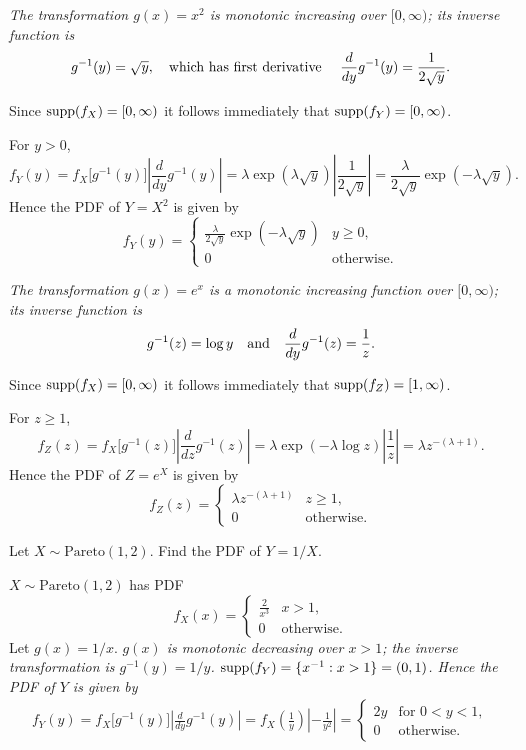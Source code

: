\begin{exercise}
\begin{questions}
\begin{answer}
\ben
\it %
The transformation $g(x)=x^2$ is monotonic increasing over $[0,\infty)$; its inverse function is
\[
g^{-1}(y) =  \sqrt{y},\text{\quad which has first derivative \quad} \frac{d}{dy}g^{-1}(y) = \frac{1}{2\sqrt{y}}.
\]

Since $\text{supp}(f_X)=[0,\infty)$ it follows immediately that $\text{supp}(f_Y)=[0,\infty)$.
\par
For $y>0$, 
\[
f_Y(y) 
	= f_X\big[g^{-1}(y)\big]\left|\frac{d}{dy}g^{-1}(y)\right| 
	= \lambda\exp(\lambda\sqrt{y}) \left| \frac{1}{2\sqrt{y}}\right|
	= \frac{\lambda}{2\sqrt{y}}\exp(-\lambda\sqrt{y}).
\]
Hence the PDF of $Y=X^2$ is given by
\[
f_Y(y) = \left\{\begin{array}{ll}
	\displaystyle\frac{\lambda}{2\sqrt{y}}\exp(-\lambda\sqrt{y}) & y\geq 0, \\[2ex]
	0 & \text{otherwise}.
\end{array}\right.
\]

\it %
The transformation $g(x)=e^x$ is a monotonic increasing function over $[0,\infty)$; its inverse function is
\[
g^{-1}(z) = \log y \text{\quad and\quad} \frac{d}{dy}g^{-1}(z) = \frac{1}{z}.
\]

Since $\text{supp}(f_X)=[0,\infty)$ it follows immediately that $\text{supp}(f_Z)=[1,\infty)$.
\par
For $z\geq 1$,
\[
f_Z(z) 
	= f_X\big[g^{-1}(z)\big]\left|\frac{d}{dz}g^{-1}(z)\right|
	= \lambda\exp(-\lambda\log z)\left|\frac{1}{z}\right| 
	= \lambda z^{-(\lambda+1)}.
\]
Hence the PDF of $Z=e^X$ is given by
\[
f_Z(z) = \left\{\begin{array}{ll}
	\lambda z^{-(\lambda+1)} & z\geq 1, \\
	0 & \text{otherwise}.
\end{array}\right.
\]
\een
\end{answer}

\question
Let $X\sim\text{Pareto}(1,2)$. Find the PDF of $Y=1/X$.

\begin{answer}
$X\sim\text{Pareto}(1,2)$ has PDF 
\[
f_X(x) = \left\{\begin{array}{ll}
	\displaystyle\frac{2}{x^3} & x>1, \\
	0	& \text{otherwise.}
\end{array}\right.
\]
Let $g(x) = 1/x$. 
\bit
\it $g(x)$ is monotonic decreasing over $x>1$; the inverse transformation is $g^{-1}(y) = 1/y$.
\it $\text{supp}(f_Y) = \{x^{-1}:x>1\} = (0,1)$.
\eit
Hence the PDF of $Y$ is given by
\begin{align*}
f_Y(y)
	 = f_X\big[g^{-1}(y)\big]\left|\frac{d}{dy}g^{-1}(y)\right| 
	 = f_X\left(\frac{1}{y}\right)\left|-\frac{1}{y^2}\right| 
	 = \left\{\begin{array}{ll}
		2y	& \text{for } 0<y<1, \\
		0	& \text{otherwise.}
	\end{array}\right.
\end{align*}
\end{answer}




\end{questions}
\end{exercise}
